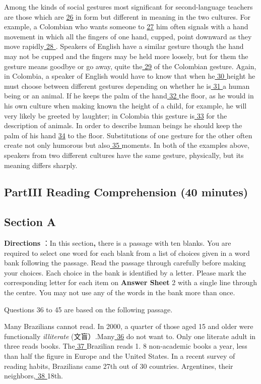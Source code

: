 \documentclass[UTF8,11pt]{ctexart}
\begin{document}
Among the kinds of social gestures most significant for second-language teachers are those which are \uline{26} in form but different in meaning in the two cultures. For example, a Colombian who wants someone to \uline{27} him often signals with a hand movement in which all the fingers of one hand, cupped, point downward as they move rapidly\uline{ 28 }. Speakers of English have a similar gesture though the hand may not be cupped and the fingers may be held more loosely, but for them the gesture means goodbye or go away, quite the\uline{ 29} of the Colombian gesture. Again, in Colombia, a speaker of English would have to know that when he\uline{ 30 }height he must choose between different gestures depending on whether he is\uline{ 31 }a human being or an animal. If he keeps the palm of the hand\uline{ 32 }the floor, as he would in his own culture when making known the height of a child, for example, he will very likely be greeted by laughter; in Colombia this gesture is\uline{ 33} for the description of animals. In order to describe human beings he should keep the palm of his hand \uline{34} to the floor. Substitutions of one gesture for the other often create not only humorous but also\uline{ 35 }moments. In both of the examples above, speakers from two different cultures have the same gesture, physically, but its meaning differs sharply.


\subsection*{\textbf{Part}III \textbf{Reading Comprehension} \textbf{(40 minutes)}}


\subsection*{Section A}


\textbf{Directions} ：In this section\textbf{,} there is a passage with ten blanks. You are required to select one word for each blank from a list of choices given in a word bank following the passage. Read the passage through carefully before making your choices. Each choice in the bank is identified by a letter. Please mark the corresponding letter for each item on \textbf{Answer Sheet} 2 with a single line through the centre. You may not use any of the words in the bank more than once.


Questions 36 to 45 are based on the following passage.


Many Brazilians cannot read. In 2000, a quarter of those aged 15 and older were functionally\textit{ illiterate} (文盲）\textit{.}Many\uline{ 36} do not want to. Only one literate adult in three reads books. The\uline{ 37 }Brazilian reads 1. 8 non-academic books a year, less than half the figure in Europe and the United States. In a recent survey of reading habits, Brazilians came 27th out of 30 countries. Argentines, their neighbors,\uline{ 38 }18th.
\end{document}
